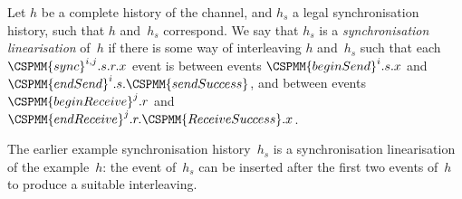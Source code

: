 \begin{definition}
\label{def:sync-lin}
Let $h$ be a complete history of the channel, and $h_s$ a legal
synchronisation history, such that $h$ and~$h_s$ correspond.  We say that
$h_s$ is a \emph{synchronisation linearisation} of~$h$ if there is some way of
interleaving $h$ and~$h_s$ such that each $\CSPMM{sync}^{i,j}.s.r.x$ event is
between events $\CSPMM{beginSend}^i.s.x$ and
$\CSPMM{endSend}^i.s.\CSPMM{sendSuccess}$, and between events
$\CSPMM{beginReceive}^j.r$ and
$\CSPMM{endReceive}^j.r.\CSPMM{ReceiveSuccess}.x$.
\end{definition}

The earlier example synchronisation history~$h_s$ is a synchronisation
linearisation of the example~$h$: the event of~$h_s$ can be inserted after the
first two events of~$h$ to produce a suitable interleaving.




